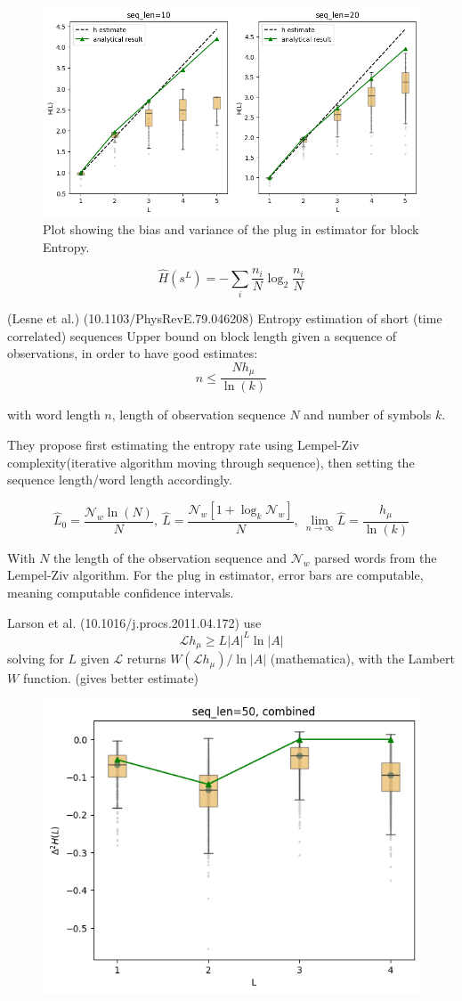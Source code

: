 \documentclass[12pt,a4paper]{article}
\begin{document}
\newpage
\begin{figure}[H]
    \centering
    \includegraphics[width=1\linewidth]{../figures/block_entropy_estimation.png}
    \caption{\label{fig:entropy_est} Plot showing the bias and variance of the plug in estimator for block Entropy.}
\end{figure}

$$\hat{H}(s^L) = -\sum_i \frac{n_i}{N} \log_2{\frac{n_i}{N}}$$

(Lesne et al.) (10.1103/PhysRevE.79.046208) Entropy estimation of short (time correlated) sequences
Upper bound on block length given a sequence of observations, in order to have good estimates:
$$ n \leq \frac{N h_\mu}{\ln(k)} $$

with word length $n$, length of observation sequence $N$ and number of symbols $k$.

They propose first estimating the entropy rate using Lempel-Ziv complexity(iterative algorithm moving through sequence), then setting the sequence length/word length accordingly.

$$ \hat{L}_0 = \frac{\mathcal{N}_w \ln(N)}{N},\ \hat{L}=\frac{\mathcal{N}_w[1+\log_k\mathcal{N}_w]}{N},\ \lim_{n \to \infty}\hat{L} = \frac{h_\mu}{\ln(k)} $$

With $N$ the length of the observation sequence and $\mathcal{N}_w$ parsed words from the Lempel-Ziv algorithm.
For the plug in estimator, error bars are computable, meaning computable confidence intervals.

Larson et al. (10.1016/j.procs.2011.04.172) use
$$ \mathcal{L} h_\mu \geq L|A|^L \ln|A| $$
solving for $L$ given $\mathcal{L}$ returns $W(\mathcal{L} h_\mu) / \ln|A|$ (mathematica), with the Lambert $W$ function.
(gives better estimate)

\begin{figure}
    \centering
    \includegraphics[width=0.5\linewidth]{../figures/predictability_gain_estimation.png}
\end{figure}
\end{document}
